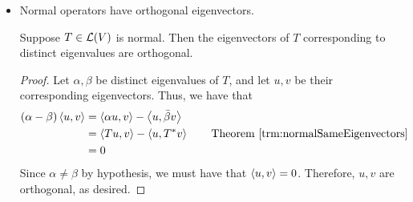 \documentclass[../main.tex]{subfiles}
\begin{document}
\begin{itemize}
\begin{theorem}
\begin{proof}
\begin{align*}
                &= (T-\lambda I)^*(T-\lambda I)
            \end{align*}
            Thus, $T-\lambda I$ is self-adjoint. It follows by Theorem \ref{trm:normalNorm} that
            \begin{equation*}
                0 = \norm{(T-\lambda I)v} = \norm{(T-\lambda I)^*v} = \norm{(T^*-\bar{\lambda}I)v}
            \end{equation*}
            Hence $(T^*-\bar{\lambda}I)v=0$, so $T^*v=\bar{\lambda}v$, so $v$ is an eigenvector of $T^*$ with eigenvalue $\bar{\lambda}$, as desired.
        \end{proof}
    \end{theorem}
    \item Normal operators have orthogonal eigenvectors.
    \begin{theorem}
        Suppose $T\in\mathcal{L}(V)$ is normal. Then the eigenvectors of $T$ corresponding to distinct eigenvalues are orthogonal.
        \begin{proof}
            Let $\alpha,\beta$ be distinct eigenvalues of $T$, and let $u,v$ be their corresponding eigenvectors. Thus, we have that
            \begin{align*}
                (\alpha-\beta)\inp{u}{v} &= \inp{\alpha u}{v}-\inp{u}{\bar{\beta}v}\\
                &= \inp{Tu}{v}-\inp{u}{T^*v}\tag*{Theorem \ref{trm:normalSameEigenvectors}}\\
                &= 0
            \end{align*}
            Since $\alpha\neq\beta$ by hypothesis, we must have that $\left\langle{u},{v}\right\rangle=0$. Therefore, $u,v$ are orthogonal, as desired.
        \end{proof}
    \end{theorem}
\end{itemize}
\end{document}
